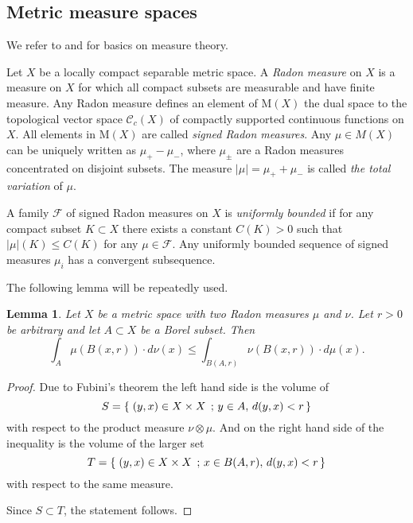 \documentclass[12pt,leqno,intlimits]{amsart}
\numberwithin{equation}{section}
\newtheorem{lem}[thm]{Lemma}
\theoremstyle{definition}
\theoremstyle{remark}
\newcommand*{\set}[2]{\left\{\,\left.{#1}\vphantom{#2}\,\right.;\,{#2}\,\right\}}
\begin{document}
\subsection{Metric measure spaces}
We refer to \cite{Federer} and \cite{Evans} for basics on measure theory.

Let $X$ be a locally compact separable metric space.
A \emph{Radon measure} on $X$ is a measure on $X$ for which all compact subsets are measurable and have finite measure.
 Any Radon measure defines an element of  $\mathrm M(X)$ the dual space to the topological vector space $\mathcal C_c (X)$ of compactly supported continuous functions on $X$.
All elements in $\mathrm M(X)$ are called \emph{signed Radon measures}.
 Any  $\mu \in M(X)$ can be uniquely written as $\mu_+-\mu_-$, where $\mu_\pm$ are a Radon measures  concentrated on disjoint subsets.
  The  measure $|\mu|=\mu_+ +\mu_-$ is called \emph{the total variation} of $\mu$.









A family $\mathcal F$ of signed Radon measures on $X$ is \emph{uniformly bounded} if for any compact subset $K\subset X$ there exists a constant $C(K)>0$ such that $|\mu| (K) \leq C(K)$ for any $\mu \in \mathcal F$.
Any uniformly bounded sequence of signed measures $\mu _i$ has a convergent subsequence.

The following lemma will be repeatedly used.

\begin{lem} \label{lem:exchange}
Let $X$ be a metric space with two Radon measures $\mu $ and $\nu$. Let $r>0$ be arbitrary and let $A\subset X$ be a Borel subset. Then
$$\int _A \mu (B(x,r)) \cdot d\nu (x) \leq \int _{B (A,r)} \nu (B (x,r)) \cdot d\mu (x).$$
\end{lem}

\begin{proof} Due to Fubini's theorem
the left hand side is the volume of
$$S=\set{(y,x) \in X\times X}{y \in A,\, d(y,x) <r}$$
with respect to the product measure $\nu \otimes \mu$. %
And on the right hand side of the inequality is the volume of the larger set
$$T=\set{(y,x) \in X\times X}{x\in B(A,r), \, d(y,x)<r}$$
with respect to the same measure.

Since $S\subset T$, the statement follows.
\end{proof}
\end{document}
